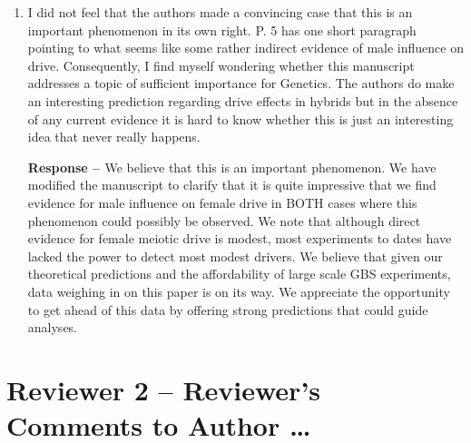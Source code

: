 \documentclass[12pt,letterpaper]{article}
\begin{document}
\begin{enumerate}
\item
\begin{singlespace}
I did not feel that the authors made a convincing case that this is an
important phenomenon in its own right.  P. 5 has one short paragraph pointing to
what seems like some rather indirect evidence of male influence on drive.
Consequently, I find myself wondering whether this manuscript addresses a topic
of sufficient importance for Genetics.  The authors do make an interesting
prediction regarding drive effects in hybrids but in the absence of any current
evidence it is hard to know whether this is just an interesting idea that never
really happens. \\
\end{singlespace}

\begin{singlespace}
	{\bf{Response -- }}  We believe that this is an important phenomenon. 
	We have modified the manuscript to clarify that it is  quite impressive that we find evidence
	for male influence on female drive in BOTH cases where this phenomenon could possibly be observed.
	We note that although direct evidence for female meiotic drive is modest, 
	most experiments to dates have lacked the power to detect most modest drivers. 
	We believe that given our theoretical predictions and the affordability of large scale GBS experiments,
	data weighing in on this paper is on its way. 
	We appreciate the opportunity to get ahead of this data by offering strong predictions that could guide analyses.
\end{singlespace}
\end{enumerate}

\newpage

\section*{Reviewer 2 -- Reviewer's Comments to Author \dots}
\end{document}
